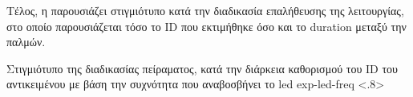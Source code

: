 Τέλος, η  παρουσιάζει στιγμιότυπο κατά την διαδικασία επαλήθευσης της λειτουργίας, στο οποίο παρουσιάζεται τόσο το ID που εκτιμήθηκε όσο και το duration μεταξύ την παλμών.

{Στιγμιότυπο της διαδικασίας πείραματος, κατά την διάρκεια καθορισμού του ID του αντικειμένου με βάση την συχνότητα που αναβοσβήνει το led}%
{exp-led-freq}%
<.8>







